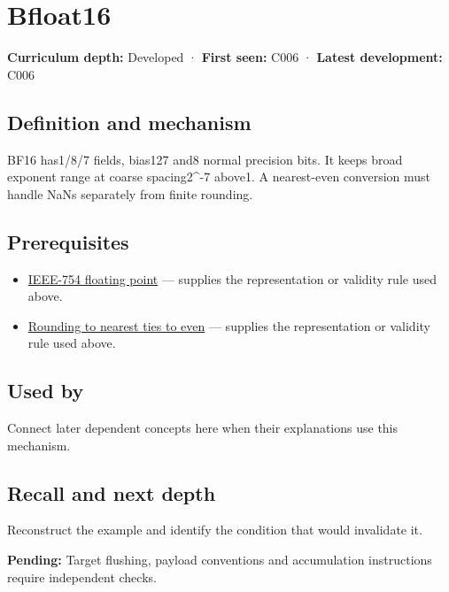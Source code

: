 \hypertarget{appendix-18b8dd966b5d}{}
\section{Bfloat16}\label{appendix-18b8dd966b5d-bfloat16}

\textbf{Curriculum depth:} Developed · \textbf{First seen:} C006 · \textbf{Latest development:} C006

\subsection{Definition and mechanism}\label{appendix-18b8dd966b5d-definition-and-mechanism}

BF16 has1/8/7 fields, bias127 and8 normal precision bits. It keeps broad exponent range at coarse spacing2\^{}-7 above1. A nearest-even conversion must handle NaNs separately from finite rounding.

\subsection{Prerequisites}\label{appendix-18b8dd966b5d-prerequisites}

\begin{itemize}
\tightlist
\item
  \hyperref[appendix-343615f49ddf]{IEEE-754 floating point} --- supplies the representation or validity rule used above.
\item
  \hyperref[appendix-614afe1de592]{Rounding to nearest ties to even} --- supplies the representation or validity rule used above.
\end{itemize}

\subsection{Used by}\label{appendix-18b8dd966b5d-used-by}

Connect later dependent concepts here when their explanations use this mechanism.

\subsection{Recall and next depth}\label{appendix-18b8dd966b5d-recall-and-next-depth}

Reconstruct the example and identify the condition that would invalidate it.

\textbf{Pending:} Target flushing, payload conventions and accumulation instructions require independent checks.

